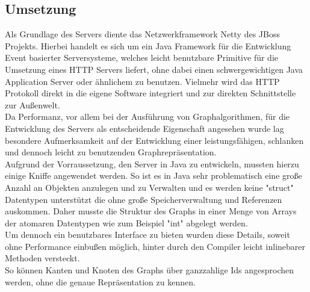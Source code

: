 \subsection*{Umsetzung}
Als Grundlage des Servers diente das Netzwerkframework Netty des JBoss Projekts. Hierbei handelt es sich um ein Java Framework für die Entwicklung Event basierter Serversysteme, welches leicht benutzbare Primitive für die Umsetzung eines HTTP Servers liefert, ohne dabei einen schwergewichtigen Java Application Server oder ähnlichem zu benutzen. Vielmehr wird das HTTP Protokoll direkt in die eigene Software integriert und zur direkten Schnittstelle zur Außenwelt.\\
Da Performanz, vor allem bei der Ausführung von Graphalgorithmen, für die Entwicklung des Servers als entscheidende Eigenschaft angesehen wurde lag besondere Aufmerksamkeit auf der Entwicklung einer leistungsfähigen, schlanken und dennoch leicht zu benutzenden Graphrepräsentation.\\
Aufgrund der Vorraussetzung, den Server in Java zu entwickeln, mussten hierzu einige Kniffe angewendet werden.
So ist es in Java sehr problematisch eine große Anzahl an Objekten anzulegen und zu Verwalten und es werden keine "struct" Datentypen unterstützt die ohne große Speicherverwaltung und Referenzen auskommen.
Daher musste die Struktur des Graphs in einer Menge von Arrays der atomaren Datentypen wie zum Beispiel "int" abgelegt werden.\\
Um dennoch ein benutzbares Interface zu bieten wurden diese Details, soweit ohne Performance einbußen möglich,  hinter durch den Compiler leicht inlinebarer Methoden versteckt.\\
So können Kanten und Knoten des Graphs über ganzzahlige Ids angesprochen werden, ohne die genaue Repräsentation zu kennen. 
